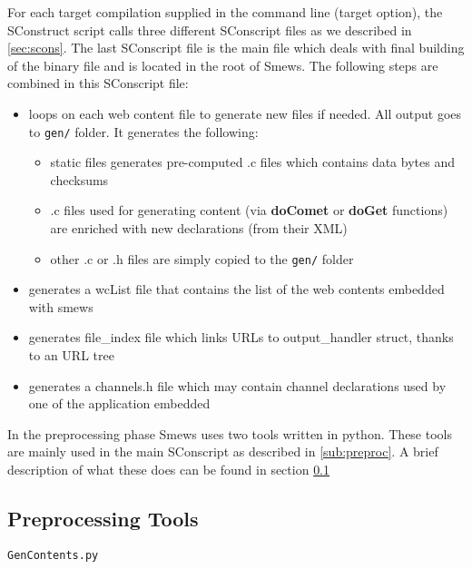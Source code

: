 \documentclass{report}
\begin{document}
For each target compilation supplied in the command line (target option), the SConstruct script calls three different SConscript files as we described in \ref{sec:scons}. The last SConscript file is the main file which deals with final building of the binary file and is located in the root of Smews.
The following steps are combined in this SConscript file:
\begin{itemize}
\item loops on each web content file to generate new files if needed. All output goes to \texttt{gen/} folder. It generates the following:
	\begin{itemize}
	 \item static files generates pre-computed .c files which contains data bytes and checksums
	 \item .c files used for generating content (via \textbf{doComet} or \textbf{doGet} functions) are enriched with new declarations (from their XML)
	 \item other .c or .h files are simply copied to the \texttt{gen/} folder
	\end{itemize}
\item generates a wcList file that contains the list of the web contents embedded with smews
\item generates file\_index file which links URLs to output\_handler struct, thanks to an URL tree
\item generates a channels.h file which may contain channel declarations used by one of the application embedded
\end{itemize}



In the preprocessing phase Smews uses two tools written in python. These tools are mainly used in the main SConscript as described in \ref{sub:preproc}. A brief description of what these does can be found in section \ref{sub:preproctools}
\newline

\subsection{Preprocessing Tools}
\label{sub:preproctools}

\texttt{GenContents.py}
\end{document}
